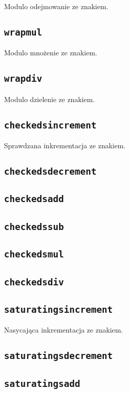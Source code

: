 Modulo odejmowanie ze znakiem.

\subsection{\texttt{wrapmul}}

Modulo mnożenie ze znakiem.

\subsection{\texttt{wrapdiv}}

Modulo dzielenie ze znakiem.

\subsection{\texttt{checkedsincrement}}

Sprawdzana inkrementacja ze znakiem.

\subsection{\texttt{checkedsdecrement}}
\subsection{\texttt{checkedsadd}}
\subsection{\texttt{checkedssub}}
\subsection{\texttt{checkedsmul}}
\subsection{\texttt{checkedsdiv}}

\subsection{\texttt{saturatingsincrement}}

Nasycająca inkrementacja ze znakiem.

\subsection{\texttt{saturatingsdecrement}}
\subsection{\texttt{saturatingsadd}}
